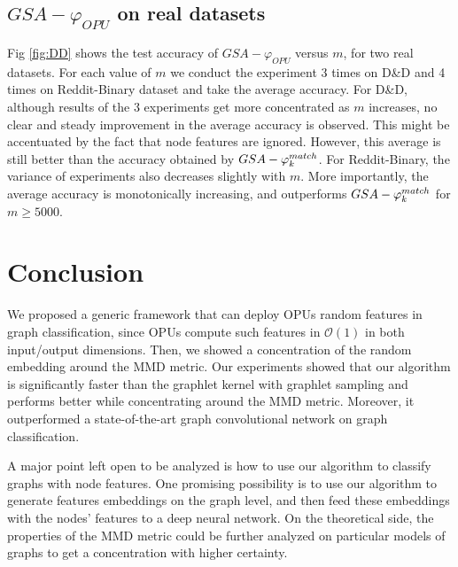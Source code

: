 \documentclass{article}
\begin{document}
\subsection{$GSA-\varphi_{OPU}$  on real datasets}\label{sec:DD_Reddit}
Fig \ref{fig:DD} shows the test accuracy of $GSA-\varphi_{OPU}$ versus $m$, for two real datasets. For each value of $m$ we conduct the experiment 3 times on D\&D and 4 times on Reddit-Binary dataset and take the average accuracy. For  D\&D, although results of the 3 experiments get more concentrated as $m$ increases, no clear and steady improvement in the average accuracy is observed. This might be accentuated by the fact that node features are ignored. However, this average is still better than the accuracy obtained by $GSA-\varphi^{match}_k$. For Reddit-Binary, the variance of experiments also decreases slightly with $m$. More importantly, the average accuracy is monotonically increasing, and outperforms  $GSA-\varphi^{match}_k$ for $m\geq5000$. 


\section{Conclusion}
\label{sec:Conclusion}

We proposed a generic framework that can deploy OPUs random features in graph classification, since OPUs compute such features  in  $\mathcal{O}(1)$ in both input/output dimensions. Then, we showed a concentration of the random embedding around the MMD metric. Our experiments showed that our algorithm is significantly faster than the graphlet kernel with graphlet sampling and  performs better while concentrating around the MMD metric. Moreover,  it outperformed a state-of-the-art graph convolutional network on graph classification.

 A major point left open to be analyzed is how to use our algorithm to classify graphs with node features. One promising possibility is to use our algorithm to generate features embeddings on the graph level, and then feed these embeddings with the nodes' features to a deep neural network. On the theoretical side, the properties of the MMD metric could be further analyzed on particular models of graphs to get a concentration with higher certainty. 





\small

\normalsize

\end{document}
